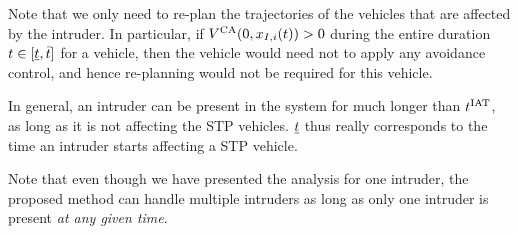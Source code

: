 \begin{remark}
Note that we only need to re-plan the trajectories of the vehicles that are affected by the intruder. In particular, if $V^{\text{CA}}(0, x_{I, i}(t)) > 0$ during the entire duration $t \in [\underline{t}, \bar{t}]$ for a vehicle, then the vehicle would need not to apply any avoidance control, and hence re-planning would not be required for this vehicle. 
\end{remark}

\begin{remark}
In general, an intruder can be present in the system for much longer than $t^\text{IAT}$, as long as it is not affecting the STP vehicles. $\underline{t}$ thus really corresponds to the time an intruder starts affecting a STP vehicle.
\end{remark}

\begin{remark}
Note that even though we have presented the analysis for one intruder, the proposed method can handle multiple intruders as long as only one intruder is present \textit{at any given time}. 
\end{remark}


